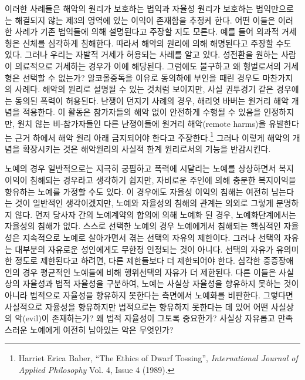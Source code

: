 이러한 사례들은 해악의 원리가 보호하는 법익과 자율성 원리가 보호하는 법익만으로는 해결되지 않는 제3의 영역에 있는 이익이 존재함을 추정케 한다. 어떤 이들은 이러한 사례가 기존 법익들에 의해 설명된다고 주장할 지도 모른다. 예를 들어 외과적 거세형은 신체를 심각하게 침해한다. 따라서 해악의 원리에 의해 해명된다고 주장할 수도 있다. 그러나 우리는 자발적 거세가 허용되는 사례를 알고 있다. 성전환을 원하는 사람이 의료적으로 거세하는 경우가 이에 해당된다. 그럼에도 불구하고 왜 형벌로서의 거세형은 선택할 수 없는가? 알코올중독을 이유로 동의하에 부인을 때린 경우도 마찬가지의 사례다. 해악의 원리로 설명될 수 있는 것처럼 보이지만, 사실 권투경기 같은 경우에는 동의된 폭력이 허용된다. 난쟁이 던지기 사례의 경우, 해리엇 바버는 원거리 해악 개념을 적용한다. 이 활동은 참가자들의 해악 없이 안전하게 수행될 수 있음을 인정하지만, 원치 않는 비-참가자들인 다른 난쟁이들에 원거리 해악(remote harms)을 유발한다는 근거 하에서 해악 원리 아래 금지되어야 한다고 주장한다.\footnote{Harriet Erica Baber, ``The Ethics of Dwarf Tossing'', \emph{International Journal of Applied Philosophy} Vol. 4, Issue 4 (1989).} 그러나 이렇게 해악의 개념을 확장시키는 것은 해악원리의 사실적 한계 원리로서의 기능을 반감시킨다.

노예의 경우 일반적으로는 지극히 궁핍하고 폭력에 시달리는 노예를 상상하면서 복지이익이 침해되는 경우라고 생각하기 쉽지만, 자비로운 주인에 의해 충분한 복지이익을 향유하는 노예를 가정할 수도 있다. 이 경우에도 자율성 이익의 침해는 여전히 남는다는 것이 일반적인 생각이겠지만, 노예와 자율성의 침해의 관계는 의외로 그렇게 분명하지 않다. 먼저 당사자 간의 노예계약의 합의에 의해 노예화 된 경우, 노예화단계에서는 자율성의 침해가 없다. 스스로 선택한 노예의 경우 노예에게서 침해되는 핵심적인 자율성은 지속적으로 노예로 살아가면서 겪는 선택의 자유의 제한이다. 그러나 선택의 자유는 대부분의 자유로운 성인에게도 무한정 인정되는 것이 아니다. 선택의 자유가 유의미한 정도로 제한된다고 하려면, 다른 제한들보다 더 제한되어야 한다. 심각한 중증장애인의 경우 평균적인 노예들에 비해 행위선택의 자유가 더 제한된다. 다른 이들은 사실상의 자율성과 법적 자율성을 구분하여, 노예는 사실상 자율성을 향유하지 못하는 것이 아니라 법적으로 자율성을 향유하지 못한다는 측면에서 노예화를 비판한다. 그렇다면 사실적으로 자율성을 향유하지만 법적으로는 향유하지 못한다는 데 있어 어떤 사실상의 악(evil)이 존재하는가? 왜 법적 자율성이 그토록 중요한가? 사실상 자유롭고 만족스러운 노예에게 여전히 남아있는 악은 무엇인가?

